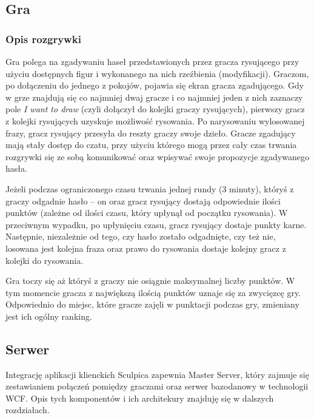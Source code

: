 \subsection{Gra}
\subsubsection{Opis rozgrywki}
Gra polega na zgadywaniu haseł przedstawionych przez gracza rysującego przy użyciu dostępnych figur i wykonanego na nich rzeźbienia (modyfikacji). Graczom, po dołączeniu do jednego z pokojów, pojawia się ekran gracza zgadującego. Gdy w grze znajdują się co najmniej dwaj gracze i co najmniej jeden z nich zaznaczy pole \textit{I want to draw} (czyli dołączył do kolejki graczy rysujących), pierwszy gracz z kolejki rysujących uzyskuje możliwość rysowania. Po narysowaniu wylosowanej frazy, gracz rysujący przesyła do reszty graczy swoje dzieło. Gracze zgadujący mają stały dostęp do czatu, przy użyciu którego mogą przez cały czas trwania rozgrywki się ze sobą komunikować oraz wpisywać swoje propozycje zgadywanego hasła.

Jeżeli podczas ograniczonego czasu trwania jednej rundy (3 minuty), któryś z graczy odgadnie hasło – on oraz gracz rysujący dostają odpowiednie ilości punktów (zależne od ilości czasu, który upłynął od początku rysowania). W przeciwnym wypadku, po upłynięciu czasu, gracz rysujący dostaje punkty karne. Następnie, niezależnie od tego, czy hasło zostało odgadnięte, czy też nie, losowana jest kolejna fraza oraz prawo do rysowania dostaje kolejny gracz z kolejki do rysowania.

Gra toczy się aż któryś z graczy nie osiągnie maksymalnej liczby punktów. W tym momencie gracza z największą ilością punktów uznaje się za zwycięzcę gry. Odpowiednio do miejsc, które gracze zajęli w punktacji podczas gry, zmieniany jest ich ogólny ranking.

\subsection{Serwer}
Integrację aplikacji klienckich Sculpica zapewnia Master Server, który zajmuje się zestawianiem połączeń pomiędzy graczami oraz serwer bazodanowy w technologii WCF. Opis tych komponentów i ich architekury znajduję się w dalszych rozdziałach.

